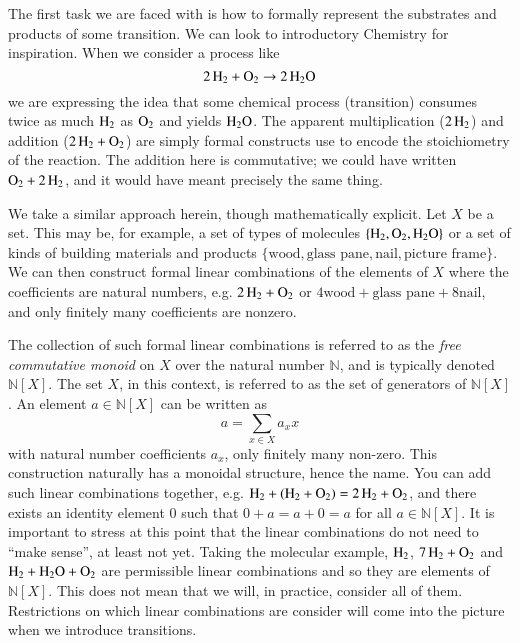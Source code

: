 \documentclass[aps,prd,onecolumn,nofootinbib,letterpaper,preprintnumbers,superscriptaddress,eqsecnum]{revtex4}
\theoremstyle{definition}
\newcommand{\N}{\mathbb{N}}
\begin{document}
The first task we are faced with is how to formally represent the substrates and products of some transition.
We can look to introductory Chemistry for inspiration.
When we consider a process like
\begin{equation*}
    \ce{2H_2} + \ce{O_2} \rightarrow \ce{2H_2O}
\end{equation*}
we are expressing the idea that some chemical process (transition) consumes twice as much $\ce{H_2}$ as $\ce{O_2}$ and yields $\ce{H_2O}$.
The apparent multiplication ($\ce{2H_2}$) and addition ($\ce{2H_2} + \ce{O_2}$) are simply formal constructs use to encode the stoichiometry of the reaction.
The addition here is commutative; we could have written $\ce{O_2} + \ce{2H_2}$, and it would have meant precisely the same thing.

We take a similar approach herein, though mathematically explicit. Let $X$ be a set. This may be, for example, a set of types of molecules $\{\ce{H_2}, \ce{O_2}, \ce{H_2O}\}$ or a set of kinds of building materials and products $\{\textrm{wood}, \textrm{glass pane}, \textrm{nail}, \textrm{picture frame}\}$.
We can then construct formal linear combinations of the elements of $X$ where the coefficients are natural numbers, e.g. $\ce{2H_2} + \ce{O_2}$ or $4\textrm{wood} + \textrm{glass pane} + 8\textrm{nail}$, and only finitely many coefficients are nonzero.

The collection of such formal linear combinations is referred to as the \textit{free commutative monoid} on $X$ over the natural number $\N$, and is typically denoted $\N[X]$.
The set $X$, in this context, is referred to as the set of generators of $\N[X]$.
An element $a \in \N[X]$ can be written as
\begin{equation*}
    a = \sum_{x \in X} a_x x
\end{equation*}
with natural number coefficients $a_x$, only finitely many non-zero.
This construction naturally has a monoidal structure, hence the name.
You can add such linear combinations together, e.g. $\ce{H_2} + (\ce{H_2} + \ce{O_2}) = \ce{2H_2} + \ce{O_2}$, and there exists an identity element $0$ such that $0 + a = a + 0 = a$ for all $a \in \N[X]$.
It is important to stress at this point that the linear combinations do not need to ``make sense'', at least not yet.
Taking the molecular example, $\ce{H_2}$, $\ce{7H_2} + \ce{O_2}$ and $\ce{H_2} + \ce{H_2O} + \ce{O_2}$ are permissible linear combinations and so they are elements of $\N[X]$.
This does not mean that we will, in practice, consider all of them.
Restrictions on which linear combinations are consider will come into the picture when we introduce transitions.
\end{document}
